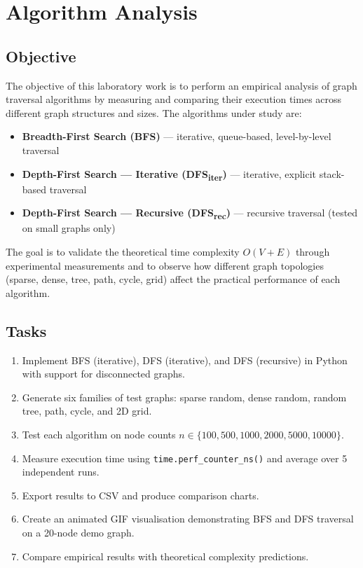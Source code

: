 
\section{Algorithm Analysis}

\subsection{Objective}
The objective of this laboratory work is to perform an empirical analysis of graph traversal algorithms by measuring and comparing their execution times across different graph structures and sizes. The algorithms under study are:
\begin{itemize}
    \item \textbf{Breadth-First Search (BFS)} — iterative, queue-based, level-by-level traversal
    \item \textbf{Depth-First Search — Iterative (DFS\textsubscript{iter})} — iterative, explicit stack-based traversal
    \item \textbf{Depth-First Search — Recursive (DFS\textsubscript{rec})} — recursive traversal (tested on small graphs only)
\end{itemize}
The goal is to validate the theoretical time complexity $O(V + E)$ through experimental measurements and to observe how different graph topologies (sparse, dense, tree, path, cycle, grid) affect the practical performance of each algorithm.

\subsection{Tasks}
\begin{enumerate}
    \item Implement BFS (iterative), DFS (iterative), and DFS (recursive) in Python with support for disconnected graphs.
    \item Generate six families of test graphs: sparse random, dense random, random tree, path, cycle, and 2D grid.
    \item Test each algorithm on node counts $n \in \{100, 500, 1000, 2000, 5000, 10000\}$.
    \item Measure execution time using \texttt{time.perf\_counter\_ns()} and average over 5 independent runs.
    \item Export results to CSV and produce comparison charts.
    \item Create an animated GIF visualisation demonstrating BFS and DFS traversal on a 20-node demo graph.
    \item Compare empirical results with theoretical complexity predictions.
\end{enumerate}

